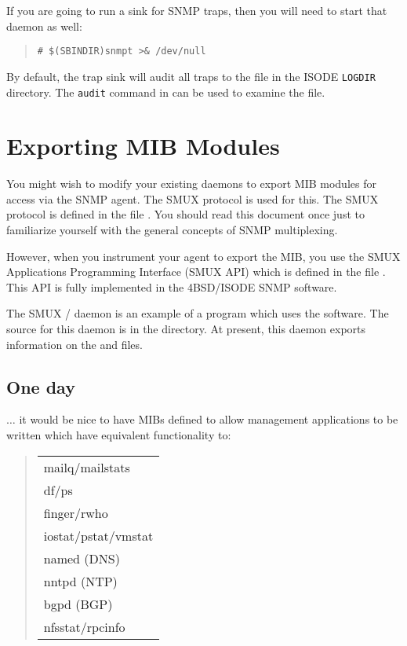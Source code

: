 \begin{enumerate}
If you are going to run a sink for SNMP traps,
then you will need to start that daemon as well:
\begin{quote}\small\begin{verbatim}
# $(SBINDIR)snmpt >& /dev/null
\end{verbatim}\end{quote}
By default,
the trap sink will audit all traps to the file  in the
ISODE \verb"LOGDIR" directory.
The \verb"audit" command in  can be used to examine the file.
\end{enumerate}

\section*	{Exporting MIB Modules}
You might wish to modify your existing daemons to export MIB modules for
access via the SNMP agent.
The SMUX protocol is used for this.
The SMUX protocol is defined in the file .
You should read this document once just to familiarize yourself with the
general concepts of SNMP multiplexing.

However,
when you instrument your agent to export the MIB,
you use the SMUX Applications Programming Interface (SMUX API) which is
defined in the file .
This API is fully implemented in the 4BSD/ISODE SNMP software.

The SMUX \unix/ daemon is an example of a program which uses the software.
The source for this daemon is in the  directory.
At present,
this daemon exports information on the  and  files.

\subsection*	{One day}
$\ldots$ it would be nice to have MIBs defined to allow management
applications to be written which have equivalent functionality to:
\begin{quote}\begin{tabular}{l}
mailq/mailstats\\
df/ps\\
finger/rwho\\
iostat/pstat/vmstat\\
named (DNS)\\
nntpd (NTP)\\
bgpd (BGP)\\
nfsstat/rpcinfo
\end{tabular}\end{quote}

